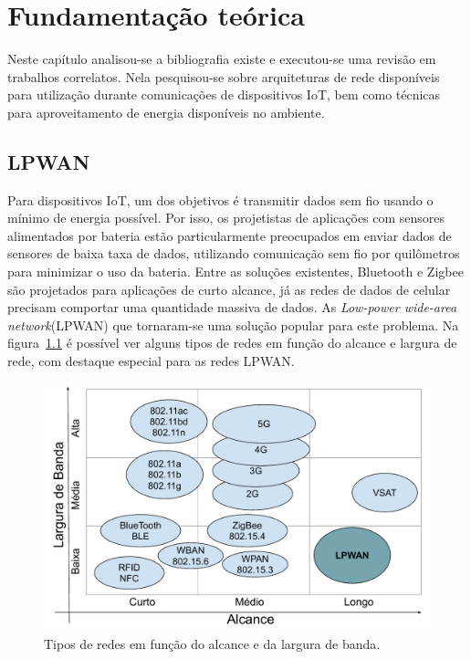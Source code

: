 \chapter{Fundamentação teórica}
Neste capítulo analisou-se a bibliografia existe e executou-se uma revisão em trabalhos correlatos. Nela pesquisou-se sobre arquiteturas de rede disponíveis para utilização durante comunicações de dispositivos IoT, bem como técnicas para aproveitamento de energia disponíveis no ambiente.

\section{LPWAN} %
Para dispositivos IoT, um dos objetivos é transmitir dados sem fio usando o mínimo de energia possível. Por isso, os projetistas de aplicações com sensores alimentados por bateria estão particularmente preocupados em enviar dados de sensores de baixa taxa de dados, utilizando comunicação sem fio por quilômetros para minimizar o uso da bateria. Entre as soluções existentes, Bluetooth e Zigbee são projetados para aplicações de curto alcance, já as redes de dados de celular precisam comportar uma quantidade massiva de dados. As \textit{Low-power wide-area network}(LPWAN) que tornaram-se uma solução popular para este problema. Na figura~\ref{fig:LPWAN} é possível ver alguns tipos de redes em função do alcance e largura de rede, com destaque especial para as redes LPWAN.
\begin{figure}
  \caption{Tipos de redes em função do alcance e da largura de banda.}
  \begin{center}
      \includegraphics[scale=0.7]{img/LPWAN.pdf}
  \end{center}
  \label{fig:LPWAN}
\end{figure}
